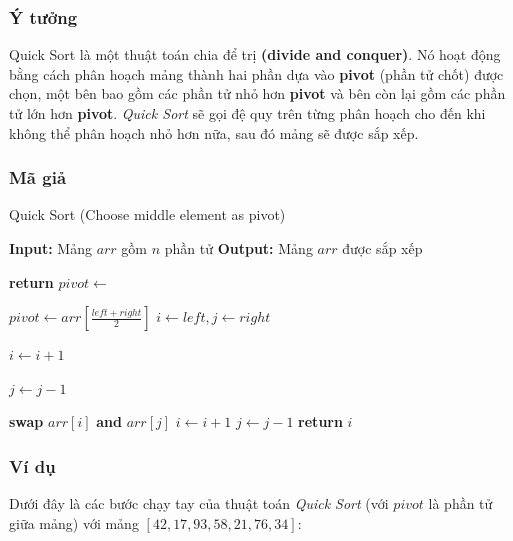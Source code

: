 \subsubsection{Ý tưởng}
Quick Sort là một thuật toán chia để trị \textbf{(divide and conquer)}. Nó hoạt động bằng cách phân hoạch mảng thành hai phần dựa vào \textbf{pivot} (phần tử chốt) được chọn, một bên bao gồm các phần tử nhỏ hơn \textbf{pivot} và bên còn lại gồm các phần tử lớn hơn \textbf{pivot}. \textit{Quick Sort} sẽ gọi đệ quy trên từng phân hoạch cho đến khi không thể phân hoạch nhỏ hơn nữa, sau đó mảng sẽ được sắp xếp.\cite{fasha2021comparative}

\subsubsection{Mã giả}
\begin{algorithm}[H]
\caption{Quick Sort (Choose middle element as pivot)}
\begin{algorithmic}[1]
    \State \textbf{Input:} Mảng $arr$ gồm $n$ phần tử 
    \State \textbf{Output:} Mảng $arr$ được sắp xếp
    \State {}
\EndProcedure

        \State \textbf{return}
    \EndIf
    \State $pivot \gets$  
    \State {}
    \State {}
\EndProcedure

 
    \State $pivot \gets arr[\frac{left + right}{2}]$
    \State $i \gets left, j \gets right$

            \State $i \gets i + 1$
        \EndWhile
    
            \State $j \gets j - 1$
        \EndWhile
    
            \State \textbf{swap} $arr[i]$ \textbf{and} $arr[j]$
            \State $i \gets i + 1$
            \State $j \gets j - 1$
        \EndIf
    \EndWhile
    \State \textbf{return} $i$
\EndProcedure
\end{algorithmic}
\end{algorithm}

\subsubsection{Ví dụ}
Dưới đây là các bước chạy tay của thuật toán \textit{Quick Sort} (với $pivot$ là phần tử giữa mảng) với mảng $[42, 17, 93, 58, 21, 76, 34]$:

